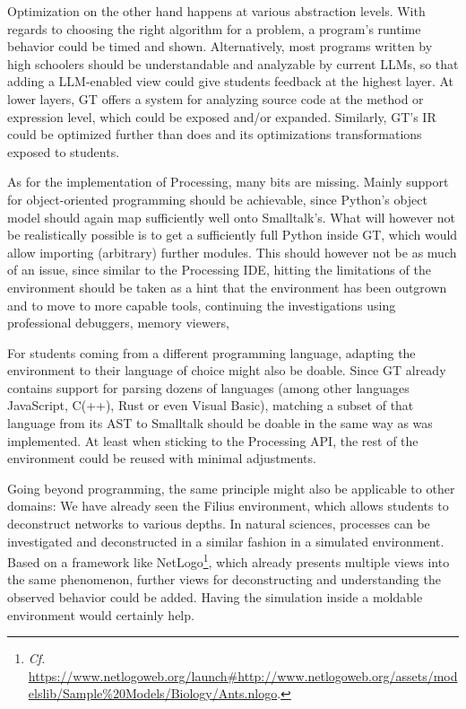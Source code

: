 Optimization on the other hand happens at various abstraction levels. With regards to choosing the right algorithm for a problem, a program's runtime behavior could be timed and shown. Alternatively, most programs written by high schoolers should be understandable and analyzable by current \acp{LLM}, so that adding a \ac{LLM}-enabled view could give students feedback at the highest layer. At lower layers, \ac{GT} offers a  system for analyzing source code at the method or expression level, which could be exposed and/or expanded. Similarly, \ac{GT}'s \ac{IR} could be optimized further than  does and its optimizations transformations exposed to students.

As for the implementation of Processing, many bits are missing. Mainly support for object-oriented programming should be achievable, since Python's object model should again map sufficiently well onto Smalltalk's. What will however not be realistically possible is to get a sufficiently full Python inside \ac{GT}, which would allow importing (arbitrary) further modules. This should however not be as much of an issue, since similar to the Processing \ac{IDE}, hitting the limitations of the environment should be taken as a hint that the environment has been outgrown and to move to more capable tools, continuing the investigations using professional debuggers, memory viewers, \etc

For students coming from a different programming language, adapting the environment to their language of choice might also be doable. Since \ac{GT} already contains support for parsing dozens of languages (among other languages JavaScript, C(++), Rust or even Visual Basic), matching a subset of that language from its \ac{AST} to Smalltalk should be doable in the same way as  was implemented. At least when sticking to the Processing \ac{API}, the rest of the environment could be reused with minimal adjustments.

Going beyond programming, the same principle might also be applicable to other domains: We have already seen the Filius environment, which allows students to deconstruct networks to various depths. In natural sciences, processes can be investigated and deconstructed in a similar fashion in a simulated environment. Based on a framework like NetLogo\footnote{\emph{Cf.} \eg \url{https://www.netlogoweb.org/launch\#http://www.netlogoweb.org/assets/modelslib/Sample\%20Models/Biology/Ants.nlogo}.}, which already presents multiple views into the same phenomenon, further views for deconstructing and understanding the observed behavior could be added. Having the simulation inside a moldable environment would certainly help.

